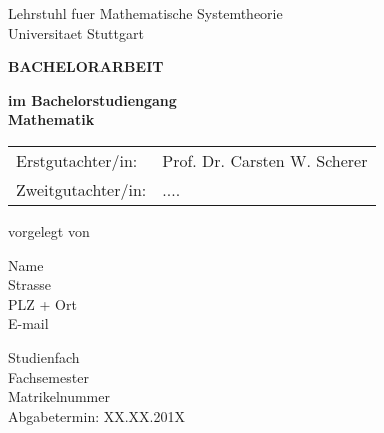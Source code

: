 \documentclass[12pt]{article}
\begin{document}
\clearpage
\setlength{\hoffset}{-15mm}


\begin{titlepage}

\begin{center}
\smc
Lehrstuhl fuer Mathematische Systemtheorie\\
Universitaet Stuttgart\\

\vspace{2.5cm}

\Large \textbf{BACHELORARBEIT}

\vspace{2cm}

\large\textbf{im Bachelorstudiengang \\Mathematik}\\

\vspace{3cm}



\vspace{3cm}
\begin{table}[h]
	\centering
		\begin{tabular}{ll}
Erstgutachter/in:  & Prof. Dr. Carsten W. Scherer\\
Zweitgutachter/in: & ....\\
		\end{tabular}
\end{table}

\vspace{3cm}
\normalsize vorgelegt von
\end{center}

\vfill
\parbox{5cm}{\footnotesize
            Name\\
            Strasse\\
            PLZ + Ort\\
            E-mail}
\hfill
\parbox{5cm}{\footnotesize
            Studienfach\\
            Fachsemester\\
            Matrikelnummer\\
            Abgabetermin: XX.XX.201X}

\end{titlepage}
\end{document}
